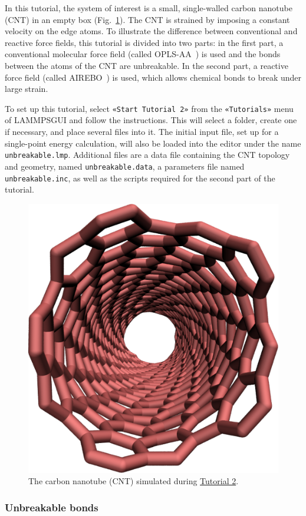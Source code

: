 \documentclass[9pt,tutorial]{livecoms}
\newcommand{\flecmd}[1]{\textcolor{command}{\texttt{#1}}} %
\newcommand{\guicmd}[1]{\textcolor{command}{\texttt{«#1»}}} %
\newcommand{\lammpsgui}{\textsf{LAMMPS\textendash GUI}}
\begin{document}
In this tutorial, the system of interest is a small, single-walled
carbon nanotube (CNT) in an empty box (Fig.~\ref{fig:CNT}).  The CNT is
strained by imposing a constant velocity on the edge atoms.  To
illustrate the difference between conventional and reactive force
fields, this tutorial is divided into two parts: in the first part, a
conventional molecular force field (called
OPLS-AA~\cite{jorgensenDevelopmentTestingOPLS1996}) is used and the
bonds between the atoms of the CNT are unbreakable.  In the second part,
a reactive force field (called AIREBO~\cite{stuart2000reactive}) is
used, which allows chemical bonds to break under large strain.

To set up this tutorial, select \guicmd{Start Tutorial 2} from the
\guicmd{Tutorials} menu of \lammpsgui{} and follow the instructions.
This will select a folder, create one if necessary, and place several
files into it.  The initial input file, set up for a single-point energy
calculation, will also be loaded into the editor under the name
\flecmd{unbreakable.lmp}.  Additional files are a data file containing
the CNT topology and geometry, named \flecmd{unbreakable.data}, a
parameters file named \flecmd{unbreakable.inc}, as well as the scripts
required for the second part of the tutorial.

\begin{figure}
\centering
\includegraphics[width=0.55\linewidth]{CNT}
\caption{The carbon nanotube (CNT) simulated during
\hyperref[carbon-nanotube-label]{Tutorial 2}.}
\label{fig:CNT}
\end{figure}

\subsubsection{Unbreakable bonds}
\end{document}
